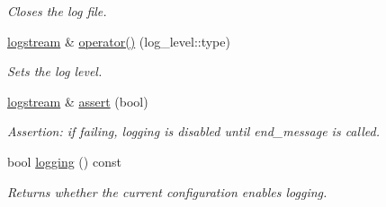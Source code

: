 \begin{DoxyCompactItemize}
\begin{DoxyCompactList}\small\item\em Closes the log file. \end{DoxyCompactList}\item 
\hypertarget{a00330_a5a393fe8ddeb2980990a6274ecb2bd61}{}\hyperlink{a00330}{logstream} \& \hyperlink{a00330_a5a393fe8ddeb2980990a6274ecb2bd61}{operator()} (log\+\_\+level\+::type)\label{a00330_a5a393fe8ddeb2980990a6274ecb2bd61}

\begin{DoxyCompactList}\small\item\em Sets the log level. \end{DoxyCompactList}\item 
\hyperlink{a00330}{logstream} \& \hyperlink{a00330_a56de0ce1889be01adc18292271e53b42}{assert} (bool)
\begin{DoxyCompactList}\small\item\em Assertion\+: if failing, logging is disabled until end\+\_\+message is called. \end{DoxyCompactList}\item 
\hypertarget{a00330_a402aaf9489352bd0f003500db0c08567}{}bool \hyperlink{a00330_a402aaf9489352bd0f003500db0c08567}{logging} () const \label{a00330_a402aaf9489352bd0f003500db0c08567}

\begin{DoxyCompactList}\small\item\em Returns whether the current configuration enables logging. \end{DoxyCompactList}\end{DoxyCompactItemize}
